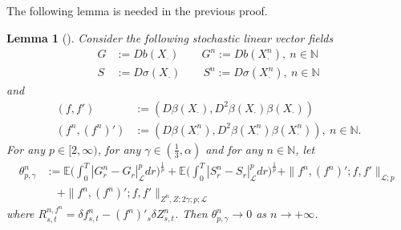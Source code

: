 \documentclass[11pt,a4paper]{article}
\newcommand{\E}{\mathbb{E}}
\theoremstyle{plain}
\newtheorem{lemma}[defn]{Lemma}
\begin{document}
The following lemma is needed in the previous proof. 
\begin{lemma}[] \label{lemma:stabilityforstochasticlinearvectorfields}
    Consider the following stochastic linear vector fields \begin{align*} 
    G&:= Db(X_\cdot) \qquad G^n:= Db(X^n_\cdot), \ n \in \mathbb{N}\\ \label{eq:vectorfieldsS} S&:= D\sigma(X_\cdot) \qquad S^n:= D\sigma(X^n_\cdot), \ n \in \mathbb{N}
\end{align*} and \begin{equation*} \begin{aligned}
    (f,f') &:= (D\beta(X_\cdot),D^2\beta(X_\cdot)\beta(X_\cdot)) \\
    (f^n,(f^n)') &:= (D\beta(X^n_\cdot),D^2\beta(X^n_\cdot)\beta(X^n_\cdot)), \ n \in \mathbb{N} . 
\end{aligned}
\end{equation*} 
For any $p \in [2,\infty)$, for any $\gamma \in (\frac{1}{3},\alpha)$ and for any $n \in \mathbb{N}$, let \begin{equation*} \begin{aligned}
        \theta^n_{p,\gamma} &:= \E\Big( \int_0^T |G^n_r-{G}_r|_{\mathscr{L}}^p dr \Big)^\frac1p + \E\Big( \int_0^T |S^n_r-{S}_r|_{\mathscr{L}}^p dr \Big)^\frac1p  + \| f^n , (f^n)' ; f, f' \|_{\mathscr{L};p}  \\ & \quad + \| f^n , (f^n)' ; f, f' \|_{Z^n,Z;2\gamma;p;\mathscr{L}} 
\end{aligned}
\end{equation*} where $R^{n,{f^n}}_{s,t}=\delta f^n_{s,t}-(f^n)'_s\delta Z^n_{s,t}$. Then $ \theta^n_{p,\gamma} \to 0$ as $n \to +\infty$.  
\end{lemma}
\end{document}
